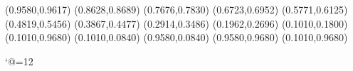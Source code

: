 \PST@Diamond(0.9580,0.9617)
\PST@Diamond(0.8628,0.8689)
\PST@Diamond(0.7676,0.7830)
\PST@Diamond(0.6723,0.6952)
\PST@Diamond(0.5771,0.6125)
\PST@Diamond(0.4819,0.5456)
\PST@Diamond(0.3867,0.4477)
\PST@Diamond(0.2914,0.3486)
\PST@Diamond(0.1962,0.2696)
\PST@Diamond(0.1010,0.1800)
\PST@Border(0.1010,0.9680)
(0.1010,0.0840)
(0.9580,0.0840)
(0.9580,0.9680)
(0.1010,0.9680)

\catcode`@=12
\fi
\endpspicture
